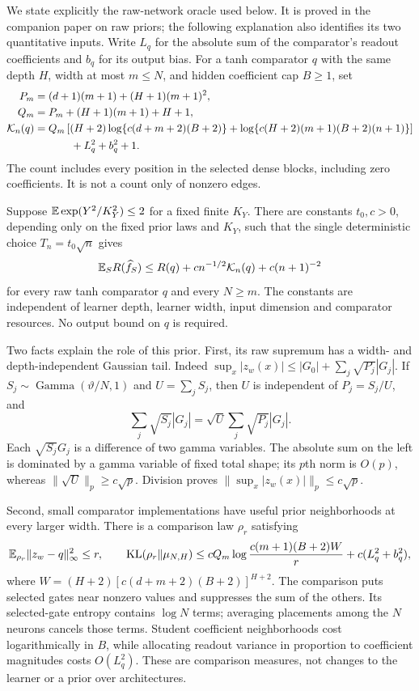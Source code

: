 We state explicitly the raw-network oracle used below.  It is proved in
the companion paper on raw priors\cite{rawprior}; the following explanation
also identifies its two quantitative inputs.  Write $L_q$ for the absolute
sum of the comparator's readout coefficients and $b_q$ for its output bias.
For a tanh comparator $q$ with the same depth $H$, width at most $m\le N$,
and hidden coefficient cap $B\ge1$, set
\begin{align}
 P_m&=(d+1)(m+1)+(H+1)(m+1)^2,\notag\\
 Q_m&=P_m+(H+1)(m+1)+H+1,\notag\\
 \mathcal K_n(q)&=Q_m\left[(H+2)\log\{c(d+m+2)(B+2)\}
       +\log\{c(H+2)(m+1)(B+2)(n+1)\}\right]\notag\\
 &\hspace{12mm}+L_q^2+b_q^2+1.\label{eq:raw-comparison-resource}
\end{align}
The count includes every position in the selected dense blocks, including
zero coefficients.  It is not a count only of nonzero edges.

\begin{proposition}\label{prop:raw-network-oracle}
Suppose $\mathbb E\exp(Y^2/K_Y^2)\le2$ for a fixed finite $K_Y$.
There are constants $t_0,c>0$, depending only on the fixed prior laws and
$K_Y$, such that the single deterministic choice $T_n=t_0\sqrt n$ gives
\[
 \mathbb E_S R(\widehat f_S)\le R(q)+c n^{-1/2}\mathcal K_n(q)+c(n+1)^{-2}
\]
for every raw tanh comparator $q$ and every $N\ge m$.  The constants are
independent of learner depth, learner width, input dimension and comparator
resources.  No output bound on $q$ is required.
\end{proposition}

Two facts explain the role of this prior.  First, its raw supremum has a
width- and depth-independent Gaussian tail.  Indeed
$\sup_x|z_w(x)|\le|G_0|+\sum_j\sqrt{P_j}|G_j|$.
If $S_j\sim\operatorname{Gamma}(\vartheta/N,1)$ and $U=\sum_jS_j$, then
$U$ is independent of $P_j=S_j/U$, and
\[
 \sum_j\sqrt{S_j}|G_j|=\sqrt U\sum_j\sqrt{P_j}|G_j|.
\]
Each $\sqrt{S_j}G_j$ is a difference of two gamma variables.  The absolute
sum on the left is dominated by a gamma variable of fixed total shape;
its $p$th norm is $O(p)$, whereas $\|\sqrt U\|_p\ge c\sqrt p$.
Division proves $\|\sup_x|z_w(x)|\|_p\le c\sqrt p$.

Second, small comparator implementations have useful prior neighborhoods
at every larger width.  There is a comparison law $\rho_r$ satisfying
\[
 \mathbb E_{\rho_r}\|z_w-q\|_\infty^2\le r,
 \qquad
 \operatorname{KL}(\rho_r\|\mu_{N,H})
 \le cQ_m\log\frac{c(m+1)(B+2)W}{r}
          +c(L_q^2+b_q^2),
\]
where $W=(H+2)[c(d+m+2)(B+2)]^{H+2}$.
The comparison puts selected gates near nonzero values and suppresses the
sum of the others.  Its selected-gate entropy contains $\log N$ terms;
averaging placements among the $N$ neurons cancels those terms.  Student
coefficient neighborhoods cost logarithmically in $B$, while allocating
readout variance in proportion to coefficient magnitudes costs $O(L_q^2)$.
These are comparison measures, not changes to the learner or a prior over
architectures.

